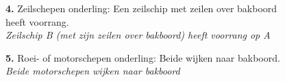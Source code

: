 \begin{figure}[H]
	\centering
	\begin{minipage}[t]{0.70\textwidth}
		\textbf{4.} Zeilschepen onderling: Een zeilschip met zeilen over bakboord heeft voorrang.\\
		\textit{Zeilschip B (met zijn zeilen over bakboord) heeft voorrang op A}
	\end{minipage}
	\hfill
	\begin{minipage}[t]{0.25\textwidth}
		\label{pic:tg4}
	\end{minipage}
	\hfill
\end{figure}
\vspace{-0.7cm}

\begin{figure}[H]
	\centering
	\begin{minipage}[t]{0.70\textwidth}
		\textbf{5.} Roei- of motorschepen onderling: Beide wijken naar bakboord.\\
		\textit{Beide motorschepen wijken naar bakboord}
	\end{minipage}
	\hfill
	\begin{minipage}[t]{0.25\textwidth}
		\label{pic:tg5}
	\end{minipage}
	\hfill
\end{figure}

